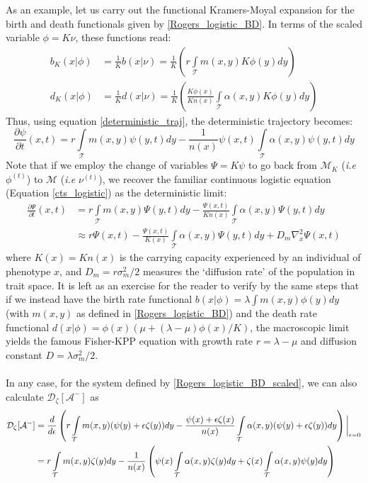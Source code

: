 As an example, let us carry out the functional Kramers-Moyal expansion for the birth and death functionals given by \eqref{Rogers_logistic_BD}. In terms of the scaled variable $\phi = K\nu$, these functions read:
\begin{equation}
\label{Rogers_logistic_BD_scaled}
\begin{aligned}
b_K(x|\phi) &= \frac{1}{K}b(x|\nu) = \frac{1}{K}\left( r\int\limits_{\mathcal{T}}m(x,y)K\phi(y)dy\right)\\
    d_K(x|\phi) &= \frac{1}{K}d(x|\nu) =  \frac{1}{K}\left(\frac{K\phi(x)}{Kn(x)}\int\limits_{\mathcal{T}}\alpha(x,y)K\phi(y)dy\right)
\end{aligned}
\end{equation}
Thus, using equation \eqref{deterministic_traj}, the deterministic trajectory becomes:
\begin{equation}
\label{Rogers_logistic_BD_deterministic}
\frac{\partial \psi}{\partial t}(x,t) = r\int\limits_{\mathcal{T}}m(x,y)\psi(y,t)dy-\frac{1}{n(x)}\psi(x,t)\int\limits_{\mathcal{T}}\alpha(x,y)\psi(y,t)dy
\end{equation}
Note that if we employ the change of variables $\Psi = K\psi$ to go back from $\mathcal{M}_{K}$ (\textit{i.e} $\phi^{(t)}$) to $\mathcal{M}$ (\textit{i.e} $\nu^{(t)}$), we recover the familiar continuous logistic equation (Equation \eqref{cts_logistic}) as the deterministic limit:
\begin{align*}
\frac{\partial \Psi}{\partial t}(x,t) &= r\int\limits_{\mathcal{T}}m(x,y)\Psi(y,t)dy-\frac{\Psi(x,t)}{Kn(x)}\int\limits_{\mathcal{T}}\alpha(x,y)\Psi(y,t)dy \\
&\approx r\Psi(x,t) -\frac{\Psi(x,t)}{K(x)}\int\limits_{\mathcal{T}}\alpha(x,y)\Psi(y,t)dy + D_m\nabla^2_{x}\Psi(x,t)
\end{align*}
where $K(x) = Kn(x)$ is the carrying capacity experienced by an individual of phenotype $x$, and $D_m = r \sigma_m^2/2$ measures the `diffusion rate' of the population in trait space. It is left as an exercise for the reader to verify by the same steps that if we instead have the birth rate functional $b(x|\phi) = \lambda\int m(x,y)\phi(y)dy$ (with $m(x,y)$ as defined in \eqref{Rogers_logistic_BD}) and the death rate functional $d(x|\phi) = \phi(x)\left(\mu+(\lambda-\mu)\phi(x)/K\right)$, the macroscopic limit yields the famous Fisher-KPP equation with growth rate $r=\lambda-\mu$ and diffusion constant $D = \lambda \sigma_m^2/2$.\\
\\
In any case, for the system defined by \eqref{Rogers_logistic_BD_scaled}, we can also calculate $\mathcal{D}_{\zeta}[\mathcal{A}^-]$ as
\begin{align*}
\mathcal{D}_{\zeta}[\mathcal{A}^-] &= \frac{d}{d\epsilon}\left( r\int\limits_{\mathcal{T}} m(x,y)(\psi(y)+\epsilon\zeta(y))dy - \frac{\psi(x)+\epsilon\zeta(x)}{n(x)}\int\limits_{\mathcal{T}}\alpha(x,y)(\psi(y)+\epsilon\zeta(y))dy\right) \biggl{|}_{\epsilon = 0}\\
&= r\int\limits_{\mathcal{T}}m(x,y)\zeta(y)dy - \frac{1}{n(x)}\left(\psi(x)\int\limits_{\mathcal{T}}\alpha(x,y)\zeta(y)dy + \zeta(x)\int\limits_{\mathcal{T}}\alpha(x,y)\psi(y)dy\right)
\end{align*}